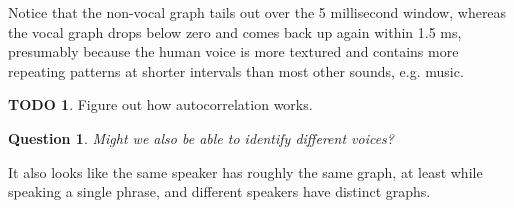\documentclass[12pt]{article}
\theoremstyle{plain}
\newtheorem{question}[theorem]{Question}
\theoremstyle{definition}
\newtheorem*{todo}{TODO}
\theoremstyle{remark}
\begin{document}
Notice that the non-vocal graph tails out over the 5 millisecond window, whereas the vocal graph drops below zero and comes back up again within 1.5 ms, presumably because the human voice is more textured and contains more repeating patterns at shorter intervals than most other sounds, e.g. music.

\begin{todo}
Figure out how autocorrelation works.
\end{todo}

\begin{question}
Might we also be able to identify different voices?
\end{question}

It also looks like the same speaker has roughly the same graph, at least while speaking a single phrase, and different speakers have distinct graphs.
\end{document}
